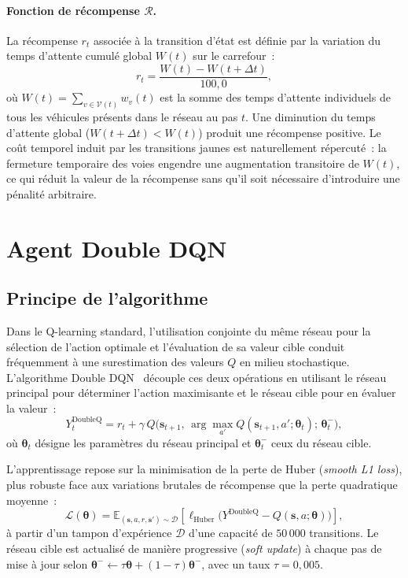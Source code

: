 \documentclass[11pt,a4paper]{article}
\begin{document}
\paragraph{Fonction de récompense $\mathcal{R}$.}
La récompense $r_t$ associée à la transition d'état est définie par la variation du temps d'attente cumulé global $W(t)$ sur le carrefour~:
\begin{equation}
\label{eq:reward}
r_t = \frac{W(t) - W(t + \Delta t)}{100{,}0},
\end{equation}
où $W(t) = \sum_{v \in \mathcal{V}(t)} w_v(t)$ est la somme des temps d'attente individuels de tous les véhicules présents dans le réseau au pas $t$. Une diminution du temps d'attente global ($W(t + \Delta t) < W(t)$) produit une récompense positive. Le coût temporel induit par les transitions jaunes est naturellement répercuté~: la fermeture temporaire des voies engendre une augmentation transitoire de $W(t)$, ce qui réduit la valeur de la récompense sans qu'il soit nécessaire d'introduire une pénalité arbitraire.

\section{Agent Double DQN}
\label{sec:algo}

\subsection{Principe de l'algorithme}
Dans le Q-learning standard, l'utilisation conjointe du même réseau pour la sélection de l'action optimale et l'évaluation de sa valeur cible conduit fréquemment à une surestimation des valeurs $Q$ en milieu stochastique. L'algorithme Double DQN~\cite{van2016deep} découple ces deux opérations en utilisant le réseau principal pour déterminer l'action maximisante et le réseau cible pour en évaluer la valeur~:
\begin{equation}
\label{eq:target_ddqn}
Y_t^{\text{DoubleQ}} = r_t + \gamma \, Q\big(\mathbf{s}_{t+1}, \, \arg\max_{a'} Q(\mathbf{s}_{t+1}, a'; \boldsymbol{\theta}_t); \, \boldsymbol{\theta}_t^-\big),
\end{equation}
où $\boldsymbol{\theta}_t$ désigne les paramètres du réseau principal et $\boldsymbol{\theta}_t^-$ ceux du réseau cible.

L'apprentissage repose sur la minimisation de la perte de Huber (\emph{smooth L1 loss}), plus robuste face aux variations brutales de récompense que la perte quadratique moyenne~:
\begin{equation}
\label{eq:loss}
\mathcal{L}(\boldsymbol{\theta}) = \mathbb{E}_{(\mathbf{s}, a, r, \mathbf{s}') \sim \mathcal{D}} \left[ \ell_{\text{Huber}}\big(Y^{\text{DoubleQ}} - Q(\mathbf{s}, a; \boldsymbol{\theta})\big) \right],
\end{equation}
à partir d'un tampon d'expérience $\mathcal{D}$ d'une capacité de $50\,000$ transitions. Le réseau cible est actualisé de manière progressive (\emph{soft update}) à chaque pas de mise à jour selon $\boldsymbol{\theta}^- \leftarrow \tau \boldsymbol{\theta} + (1 - \tau) \boldsymbol{\theta}^-$, avec un taux $\tau = 0{,}005$.
\end{document}
